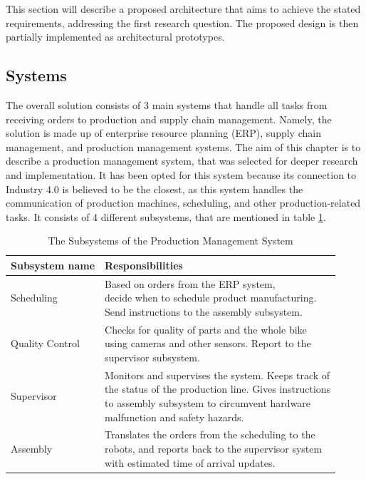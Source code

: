 \documentclass[conference]{IEEEtran}
\begin{document}
This section will describe a proposed architecture that aims to achieve the stated requirements, addressing the first research question. The proposed design is then partially implemented as architectural prototypes.

\subsection{Systems}
The overall solution consists of 3 main systems that handle all tasks from receiving orders to production and supply chain management. Namely, the solution is made up of enterprise resource planning (ERP), supply chain management, and production management systems. The aim of this chapter is to describe a production management system, that was selected for deeper research and implementation. It has been opted for this system because its connection to Industry 4.0 is believed to be the closest, as this system handles the communication of production machines, scheduling, and other production-related tasks. It consists of 4 different subsystems, that are mentioned in table \ref{tab:subsystem}.

\begin{table}[htbp]
\caption{The Subsystems of the Production Management System}
\begin{center}
\begin{tabular}{|l|l|}
\hline
\textbf{Subsystem name}  & \textbf{Responsibilities} \\ \hline
Scheduling              & \makecell[l]{Based on orders from the ERP system,\\ decide when to schedule product manufacturing.\\Send instructions to the assembly subsystem.}   \\ \hline
Quality Control       & \makecell[l]{Checks for quality of parts and the whole bike\\ using cameras and other sensors. Report to the\\ supervisor subsystem.}          \\ \hline
Supervisor              & \makecell[l]{Monitors and supervises the system. Keeps track of\\ the status of the production line. Gives instructions \\to assembly subsystem to circumvent hardware\\ malfunction and safety hazards.}        \\ \hline
Assembly            & \makecell[l]{Translates the orders from the scheduling to the \\robots, and reports back to the supervisor system\\ with estimated time of arrival updates.}      
            \\ \hline
\end{tabular}
\end{center}
\label{tab:subsystem}
\end{table}
\end{document}
